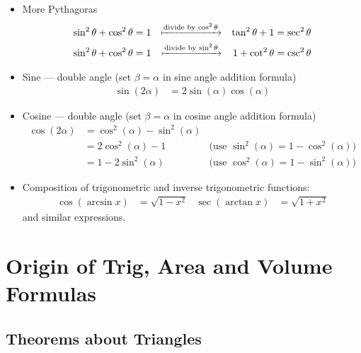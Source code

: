 \begin{itemize}
 \item More Pythagoras
\begin{align*}
\sin^2\theta + \cos^2 \theta &=1 & \xmapsto{\text{divide by $\cos^2\theta$}}&&
\tan^2\theta + 1  &= \sec^2\theta \\
\sin^2\theta + \cos^2 \theta &=1 & \xmapsto{\text{divide by $\sin^2\theta$}}&&
1 + \cot^2 \theta &=\csc^2\theta
\end{align*}

 \item Sine --- double angle (set $\beta =\alpha$ in sine angle addition formula)
\begin{align*}
  \sin(2\alpha) &= 2\sin(\alpha)\cos(\alpha)
\end{align*}
 \item Cosine --- double angle (set $\beta =\alpha$ in cosine angle addition formula)
\begin{align*}
  \cos(2\alpha) &= \cos^2(\alpha) - \sin^2(\alpha) \\
  &= 2\cos^2(\alpha) - 1  & \text{(use $\sin^2(\alpha)= 1-\cos^2(\alpha)$)}\\
  &= 1 - 2\sin^2(\alpha) & \text{(use $\cos^2(\alpha)= 1-\sin^2(\alpha)$)}
\end{align*}
\item Composition of trigonometric and inverse trigonometric functions:
\begin{align*}
  \cos( \arcsin x) &= \sqrt{1-x^2} &
  \sec( \arctan x) &= \sqrt{1+x^2}
\end{align*}
and similar expressions.
\end{itemize}

\chapter{Origin of Trig, Area and Volume Formulas}\label{chap_app_B}
\section{Theorems about Triangles}\label{sec_B_1}
